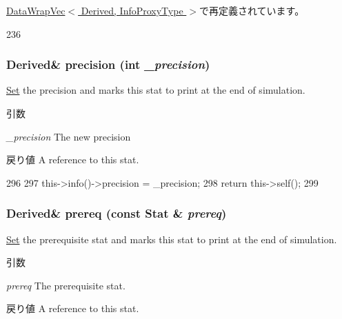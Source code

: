 \hyperlink{classStats_1_1DataWrapVec_ab855679d4219fb17e9dc46c572193966}{DataWrapVec$<$ Derived, InfoProxyType $>$}で再定義されています。


\begin{DoxyCode}
236 {}
\end{DoxyCode}
\hypertarget{classStats_1_1DataWrap_a472723dc134761499ab0ced3e38d6a26}{
\subsubsection[{precision}]{\setlength{\rightskip}{0pt plus 5cm}Derived\& precision (int {\em \_\-precision})}}
\label{classStats_1_1DataWrap_a472723dc134761499ab0ced3e38d6a26}
\hyperlink{classSet}{Set} the precision and marks this stat to print at the end of simulation. 
\begin{DoxyParams}{引数}
\item[{\em \_\-precision}]The new precision \end{DoxyParams}
\begin{DoxyReturn}{戻り値}
A reference to this stat. 
\end{DoxyReturn}



\begin{DoxyCode}
296     {
297         this->info()->precision = _precision;
298         return this->self();
299     }
\end{DoxyCode}
\hypertarget{classStats_1_1DataWrap_afdc2da9c7e7848993734ee52aa9a784a}{
\subsubsection[{prereq}]{\setlength{\rightskip}{0pt plus 5cm}Derived\& prereq (const Stat \& {\em prereq})}}
\label{classStats_1_1DataWrap_afdc2da9c7e7848993734ee52aa9a784a}
\hyperlink{classSet}{Set} the prerequisite stat and marks this stat to print at the end of simulation. 
\begin{DoxyParams}{引数}
\item[{\em prereq}]The prerequisite stat. \end{DoxyParams}
\begin{DoxyReturn}{戻り値}
A reference to this stat. 
\end{DoxyReturn}



